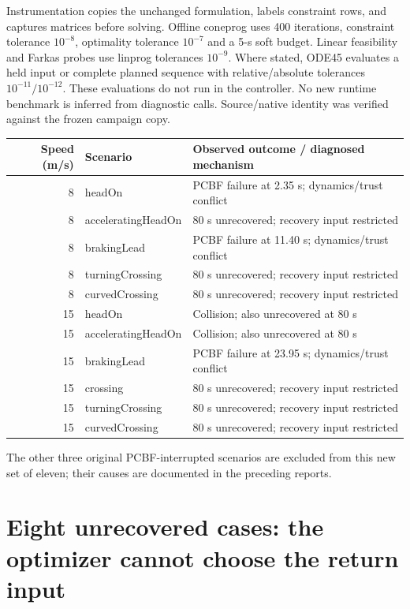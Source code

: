\documentclass[11pt]{article}
\begin{document}
Instrumentation copies the unchanged formulation, labels constraint rows,
and captures matrices before solving. Offline coneprog uses 400 iterations,
constraint tolerance $10^{-8}$, optimality tolerance $10^{-7}$ and a 5-s soft
budget. Linear feasibility and Farkas probes use linprog tolerances $10^{-9}$.
Where stated, ODE45 evaluates a held input or complete planned sequence with
relative/absolute tolerances $10^{-11}/10^{-12}$. These evaluations do not
run in the controller. No new runtime benchmark is inferred from diagnostic
calls. Source/native identity was verified against the frozen campaign copy.

\begin{center}\small
\begin{tabular}{r l l}
\toprule
Speed (m/s) & Scenario & Observed outcome / diagnosed mechanism\\
\midrule
8 & headOn & PCBF failure at 2.35 s; dynamics/trust conflict\\
8 & acceleratingHeadOn & 80 s unrecovered; recovery input restricted\\
8 & brakingLead & PCBF failure at 11.40 s; dynamics/trust conflict\\
8 & turningCrossing & 80 s unrecovered; recovery input restricted\\
8 & curvedCrossing & 80 s unrecovered; recovery input restricted\\
15 & headOn & Collision; also unrecovered at 80 s\\
15 & acceleratingHeadOn & Collision; also unrecovered at 80 s\\
15 & brakingLead & PCBF failure at 23.95 s; dynamics/trust conflict\\
15 & crossing & 80 s unrecovered; recovery input restricted\\
15 & turningCrossing & 80 s unrecovered; recovery input restricted\\
15 & curvedCrossing & 80 s unrecovered; recovery input restricted\\
\bottomrule
\end{tabular}\end{center}
The other three original PCBF-interrupted scenarios are excluded from this
new set of eleven; their causes are documented in the preceding reports.

\section{Eight unrecovered cases: the optimizer cannot choose the return input}
\end{document}
